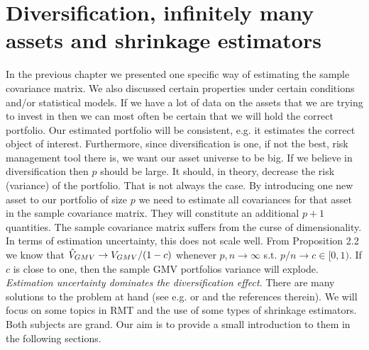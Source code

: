 \documentclass[oneside]{book}\usepackage{knitr}
\begin{document}
\chapter[Diversification \& shrinkage]{Diversification, infinitely many assets and shrinkage estimators}\label{ch:highdim}


In the previous chapter we presented one specific way of estimating the sample covariance matrix.
We also discussed certain properties under certain conditions and/or statistical models.
If we have a lot of data on the assets that we are trying to invest in then we can most often be certain that we will hold the correct portfolio.
Our estimated portfolio will be consistent, e.g. it estimates the correct object of interest. 
Furthermore, since diversification is one, if not the best, risk management tool there is, we want our asset universe to be big.
If we believe in diversification then $p$ should be large. 
It should, in theory, decrease the risk (variance) of the portfolio. 
That is not always the case.
By introducing one new asset to our portfolio of size $p$ we need to estimate all covariances for that asset in the sample covariance matrix. 
They will constitute an additional $p+1$ quantities. 
The sample covariance matrix suffers from the curse of dimensionality. 
In terms of estimation uncertainty, this does not scale well.
From \citet{bodnar2016optimal} Proposition 2.2 we know that $\hat{V}_{GMV} \rightarrow V_{GMV}/(1-c)$ whenever $p,n \rightarrow \infty$ s.t. $p/n \rightarrow c \in [0,1)$. 
If $c$ is close to one, then the sample GMV portfolios variance will explode. 
\textit{Estimation uncertainty dominates the diversification effect}. 
There are many solutions to the problem at hand (see e.g. \citet{lw17} or \citet{bodnar2021recent} and the references therein). 
We will focus on some topics in RMT and the use of some types of shrinkage estimators. 
Both subjects are grand. 
Our aim is to provide a small introduction to them in the following sections.
\end{document}
